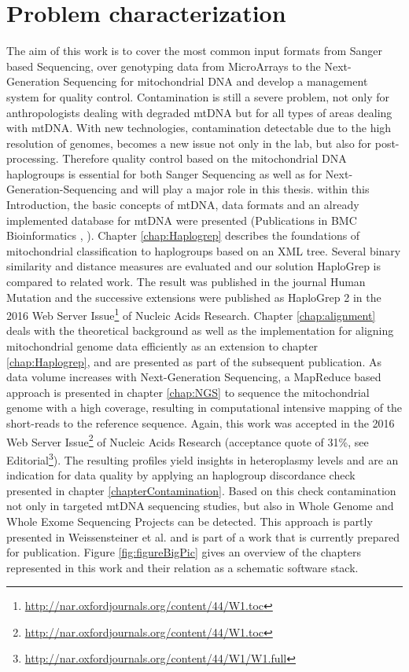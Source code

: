 \section{Problem characterization}
\label{sect:ProblChar}
The aim of this work is to cover the most common input formats from Sanger based Sequencing, over genotyping data from MicroArrays to the Next-Generation Sequencing for mitochondrial DNA and develop a management system for quality control. Contamination is still a severe problem, not only for anthropologists dealing with degraded mtDNA but  for all types of areas dealing with mtDNA. With new technologies, contamination detectable due to the high resolution of genomes, becomes a new issue not only in the lab, but also for post-processing. Therefore quality control based on the mitochondrial DNA haplogroups is essential for both Sanger Sequencing as well as for Next-Generation-Sequencing and will play a major role in this thesis. within this Introduction, the basic concepts of mtDNA, data formats and an already implemented database for mtDNA were presented (Publications in BMC Bioinformatics \cite{Schoenherr2009}, \cite{Weissensteiner2010}). Chapter \ref{chap:Haplogrep} describes the foundations of mitochondrial classification to haplogroups based on an XML tree. Several binary similarity and distance measures are evaluated and our solution HaploGrep is compared to related work. The result was published in the journal Human Mutation \cite{Kloss-Brandstatter2011} and the successive extensions were published as HaploGrep 2 in the 2016 Web Server Issue\footnote{\url{http://nar.oxfordjournals.org/content/44/W1.toc}} of Nucleic Acids Research\cite{Weissensteiner2016a}. Chapter \ref{chap:alignment} deals with the theoretical background as well as the implementation for aligning mitochondrial genome data efficiently as an extension to chapter \ref{chap:Haplogrep}, and are presented as part of the subsequent publication. As data volume increases with Next-Generation Sequencing, a MapReduce based approach is presented in chapter \ref{chap:NGS} to sequence the mitochondrial genome with a high coverage, resulting in computational intensive mapping of the short-reads to the reference sequence. Again, this work was accepted in the 2016 Web Server Issue\footnote{\url{http://nar.oxfordjournals.org/content/44/W1.toc}} of Nucleic Acids Research\cite{Weissensteiner2016b} (acceptance quote of 31\%, see Editorial\footnote{\url{http://nar.oxfordjournals.org/content/44/W1/W1.full}}). The resulting profiles yield insights in heteroplasmy levels and are an indication for data quality by applying an haplogroup discordance check presented in chapter \ref{chapterContamination}. Based on this check contamination not only in targeted mtDNA sequencing studies, but also in Whole Genome and Whole Exome Sequencing Projects can be detected. This approach is partly presented in Weissensteiner et al. \cite{Weissensteiner2016b} and is part of a work that is currently prepared for publication. Figure \ref{fig:figureBigPic} gives an overview of the chapters represented in this work and their relation as a schematic software stack.
  
